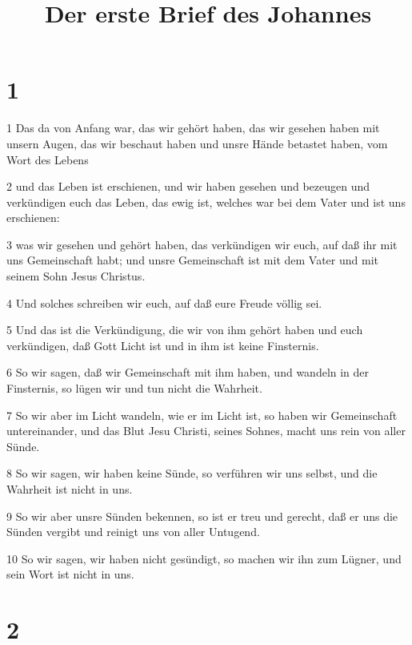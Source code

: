 

\title{Der erste Brief des Johannes}


\chapter{1}

\par 1 Das da von Anfang war, das wir gehört haben, das wir gesehen haben mit unsern Augen, das wir beschaut haben und unsre Hände betastet haben, vom Wort des Lebens
\par 2 und das Leben ist erschienen, und wir haben gesehen und bezeugen und verkündigen euch das Leben, das ewig ist, welches war bei dem Vater und ist uns erschienen:
\par 3 was wir gesehen und gehört haben, das verkündigen wir euch, auf daß ihr mit uns Gemeinschaft habt; und unsre Gemeinschaft ist mit dem Vater und mit seinem Sohn Jesus Christus.
\par 4 Und solches schreiben wir euch, auf daß eure Freude völlig sei.
\par 5 Und das ist die Verkündigung, die wir von ihm gehört haben und euch verkündigen, daß Gott Licht ist und in ihm ist keine Finsternis.
\par 6 So wir sagen, daß wir Gemeinschaft mit ihm haben, und wandeln in der Finsternis, so lügen wir und tun nicht die Wahrheit.
\par 7 So wir aber im Licht wandeln, wie er im Licht ist, so haben wir Gemeinschaft untereinander, und das Blut Jesu Christi, seines Sohnes, macht uns rein von aller Sünde.
\par 8 So wir sagen, wir haben keine Sünde, so verführen wir uns selbst, und die Wahrheit ist nicht in uns.
\par 9 So wir aber unsre Sünden bekennen, so ist er treu und gerecht, daß er uns die Sünden vergibt und reinigt uns von aller Untugend.
\par 10 So wir sagen, wir haben nicht gesündigt, so machen wir ihn zum Lügner, und sein Wort ist nicht in uns.

\chapter{2}

